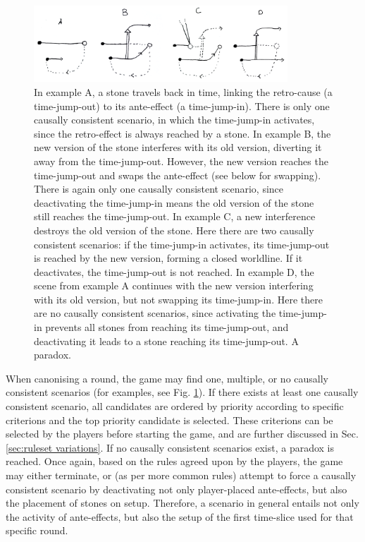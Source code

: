 \documentclass[12pt]{article}
\begin{document}
	\begin{figure}[h]
\begin{center}
    \includegraphics[width=0.85\textwidth]{images/diag_canonisation}
 \caption{In example A, a stone travels back in time, linking the retro-cause (a time-jump-out) to its ante-effect (a time-jump-in). There is only one causally consistent scenario, in which the time-jump-in activates, since the retro-effect is always reached by a stone. In example B, the new version of the stone interferes with its old version, diverting it away from the time-jump-out. However, the new version reaches the time-jump-out and swaps the ante-effect (see below for swapping). There is again only one causally consistent scenario, since deactivating the time-jump-in means the old version of the stone still reaches the time-jump-out. In example C, a new interference destroys the old version of the stone. Here there are two causally consistent scenarios: if the time-jump-in activates, its time-jump-out is reached by the new version, forming a closed worldline. If it deactivates, the time-jump-out is not reached. In example D, the scene from example A continues with the new version interfering with its old version, but not swapping its time-jump-in. Here there are no causally consistent scenarios, since activating the time-jump-in prevents all stones from reaching its time-jump-out, and deactivating it leads to a stone reaching its time-jump-out. A paradox.}\label{fig:canonisation}
\end{center}
\end{figure}
	
	When canonising a round, the game may find one, multiple, or no causally consistent scenarios (for examples, see Fig. \ref{fig:canonisation}). If there exists at least one causally consistent scenario, all candidates are ordered by priority according to specific criterions and the top priority candidate is selected. These criterions can be selected by the players before starting the game, and are further discussed in Sec. \ref{sec:ruleset variations}. If no causally consistent scenarios exist, a paradox is reached. Once again, based on the rules agreed upon by the players, the game may either terminate, or (as per more common rules) attempt to force a causally consistent scenario by deactivating not only player-placed ante-effects, but also the placement of stones on setup. Therefore, a scenario in general entails not only the activity of ante-effects, but also the setup of the first time-slice used for that specific round.
	
\end{document}
